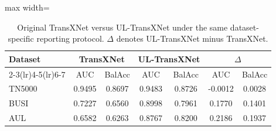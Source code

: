 \begin{table}[t]
    \centering
    \small
    \caption{Original TransXNet versus UL-TransXNet under the same dataset-specific reporting protocol. $\Delta$ denotes UL-TransXNet minus TransXNet.}
    \label{tab:original_transxnet_delta}
    \begin{adjustbox}{max width=\columnwidth}
    \begin{tabular}{lcccccc}
        \toprule
        Dataset & \multicolumn{2}{c}{TransXNet} & \multicolumn{2}{c}{UL-TransXNet} & \multicolumn{2}{c}{$\Delta$} \\
        \cmidrule(lr){2-3}\cmidrule(lr){4-5}\cmidrule(lr){6-7}
        & AUC & BalAcc & AUC & BalAcc & AUC & BalAcc \\
        \midrule
        TN5000 & 0.9495 & 0.8697 & 0.9483 & 0.8726 & -0.0012 & 0.0028 \\
        BUSI & 0.7227 & 0.6560 & 0.8998 & 0.7961 & 0.1770 & 0.1401 \\
        AUL & 0.6582 & 0.6263 & 0.8767 & 0.8200 & 0.2186 & 0.1937 \\
        \bottomrule
    \end{tabular}
    \end{adjustbox}
\end{table}

